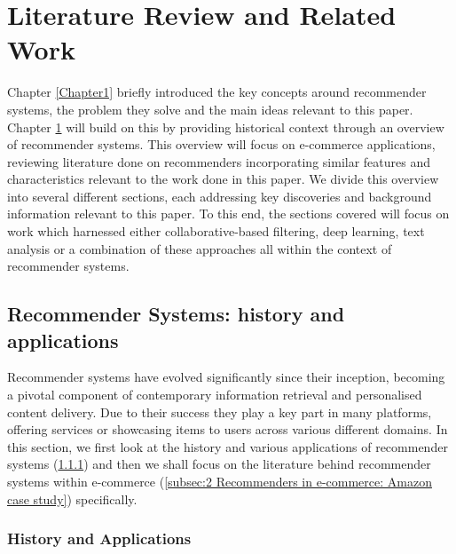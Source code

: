 
\chapter{Literature Review and Related Work} %

\label{Chapter2} %

Chapter \ref{Chapter1} briefly introduced the key concepts around recommender systems, the problem they solve and the main ideas relevant to this paper. Chapter \ref{Chapter2} will build on this by providing historical context through an overview of recommender systems. This overview will focus on e-commerce applications, reviewing literature done on recommenders incorporating similar features and characteristics relevant to the work done in this paper. We divide this overview into several different sections, each addressing key discoveries and background information relevant to this paper. To this end, the sections covered will focus on work which harnessed either collaborative-based filtering, deep learning, text analysis or a combination of these approaches all within the context of recommender systems.

\section{Recommender Systems: history and applications}
\label{sec:2 Recommender Systems: history and applications}

Recommender systems have evolved significantly since their inception, becoming a pivotal component of contemporary information retrieval and personalised content delivery. Due to their success they play a key part in many platforms, offering services or showcasing items to users across various different domains. In this section, we first look at the history and various applications of recommender systems (\ref{subsec:2 History and Applications}) and then we shall focus on the literature behind recommender systems within e-commerce (\ref{subsec:2 Recommenders in e-commerce: Amazon case study}) specifically. 


\subsection{History and Applications}
\label{subsec:2 History and Applications}

